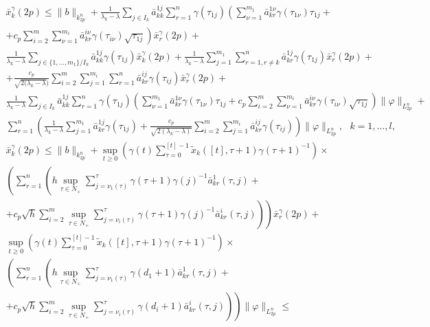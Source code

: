 $$
\begin{array}{crl}
\bar x_k^\gamma (2p) \leq  \|b\|_{k_{2p}^n} +
\frac{1}{\lambda _k - \lambda}\sum \limits_{j \in I_k}\bar
a^{1j}_{kk}\sum \limits_{r=1}^n\gamma (\tau _{1j})\left(\sum
\limits_{\nu=1}^{m_1}\bar a^{1\nu}_{kr} \gamma (\tau _{1\nu})\tau
_{1j} +
\right. \\ \left. +
c_p\sum \limits_{i=2}^m \sum \limits_{\nu=1}^{m_i}\bar
a^{i\nu}_{kr}\gamma (\tau
_{i\nu})\sqrt{\tau _{1j}}\right)\bar x_r^\gamma (2p) + \\
\frac{1}{\lambda _k - \lambda}\sum \limits_{ j \in\{1,\dots,m_1\}/
I_k}
 \bar a^{1j}_{kk}\gamma (\tau
_{1j})\bar x_k^\gamma (2p) + \frac{1}{\lambda _k - \lambda}\sum
\limits_{j=1}^{m_1}\sum \limits_{r=1,r\neq k}^{n} \bar
a^{1j}_{kr}\gamma (\tau _{1j})\bar x_r^\gamma (2p)+
\\ +
\frac{c_p}{\sqrt{2(\lambda_k -\lambda})}\sum \limits_{i=2}^m \sum
\limits_{j=1}^{m_i}\sum \limits_{r=1}^{n}\bar a^{ij}_{kr}\gamma
(\tau _{ij})\bar x_r^\gamma
(2p)+\\
\frac{1}{\lambda _k - \lambda}\sum \limits_{j \in I_k}\bar
a^{1j}_{kk}\sum \limits_{r=1}^n\gamma (\tau _{1j})\left(\sum
\limits_{\nu=1}^{m_1}\bar a^{1\nu}_{kr} \gamma (\tau _{1\nu})\tau
_{1j} + c_p\sum \limits_{i=2}^m \sum \limits_{\nu=1}^{m_i}\bar
a^{i\nu}_{kr}\gamma (\tau _{i\nu})\sqrt{\tau _{1j}}\right)\|\varphi
\|_{L_{2p}^n} +\\
\sum \limits_{r=1}^{n}\left(\frac{1}{\lambda _k - \lambda}\sum
\limits_{j=1}^{m_1}\bar a^{1j}_{kr}\gamma (\tau_{1j}) +
\frac{c_p}{\sqrt{2(\lambda_k -\lambda)}}\sum \limits_{i=2}^m \sum
\limits_{j=1}^{m_i}\bar a^{ij}_{kr}\gamma (\tau _{ij})\right)\|\varphi \|_{L_{2p}^n}, \ \ \ k = 1, \dots ,l,\\
 \bar x_k^\gamma (2p) \leq \|b\|_{k^n_{2p}}  + \mathrel {\mathop
{\sup} \limits _{t \geq 0}}\left(\gamma (t)\sum \limits _{\tau=0
}^{[t]-1}\tilde x_k([t],\tau + 1)\gamma (\tau +1)^{-1}\right)\times\\
\left(\sum \limits _{r=1 }^n \left(h\mathrel {\mathop {\sup}\limits
_{\tau \in N_+}}\sum \limits _{j=\nu _1 (\tau)}^{\tau}\gamma
(\tau + 1)\gamma (j)^{-1}\bar a^{1}_{kr}(\tau,j) +
\right. \right. \\ \left. \left. +
c_p\sqrt{h}\sum \limits _{i=2}^{m}\mathrel {\mathop {\sup} \limits
_{\tau \in N_+}}\sum \limits _{j=\nu _i (\tau)}^{\tau}\gamma
(\tau + 1)\gamma (j)^{-1}\bar a^{i}_{kr}(\tau,j) \right)\right)\bar
x_r^\gamma (2p)+\\
\mathrel {\mathop {\sup} \limits _{t \geq 0}}\left(\gamma (t)\sum
\limits _{\tau=0}^{[t]-1}\tilde x_k([t],\tau + 1)\gamma (\tau +1)^{-1}\right)\times \\
\left(\sum \limits _{r=1 }^n \left(h\mathrel {\mathop {\sup} \limits
_{\tau \in N_+}}\sum \limits _{j=\nu _1 (\tau)}^{\tau}\gamma (d_1
+1)\bar a^{1}_{kr}(\tau,j) +
\right. \right. \\ \left. \left. +
c_p\sqrt{h}\sum \limits
_{i=2}^{m}\mathrel {\mathop {\sup} \limits _{\tau \in N_+}}\sum
\limits _{j=\nu _i (\tau)}^{\tau}\gamma (d_i +1)\bar
a^{i}_{kr}(\tau,j)\right)\right)\|\varphi \|_{L_{2p}^n} \leq
\end{array}
$$

